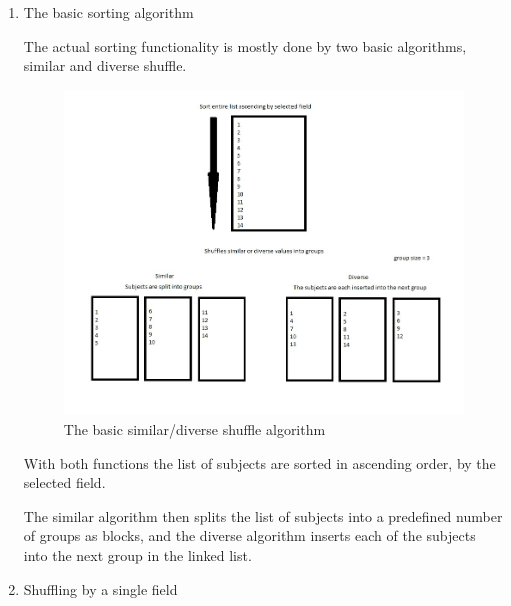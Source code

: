 \begin{enumerate}
\item The basic sorting algorithm\par

The actual sorting functionality is mostly done by two basic algorithms, similar and diverse shuffle.\par

 \begin{figure}[H] 
	\centering
	\includegraphics[width=12cm]{./graphics/basicAlgorithm.jpg}\par
	\caption{The basic similar/diverse shuffle algorithm}
\end{figure}
With both functions the list of subjects are sorted in ascending order, by the selected field.

The similar algorithm then splits the list of subjects into a predefined number of groups as blocks, and the diverse algorithm inserts each of the subjects into the next group in the linked list. 



\item Shuffling by a single field  \par


\end{enumerate}
